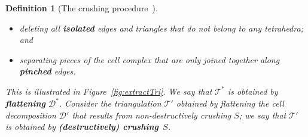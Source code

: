 \documentclass[10pt,a4paper]{amsart}
\newtheorem{definition}[theorem]{Definition}
\newcommand{\tri}{\mathcal{T}}
\begin{document}
\begin{definition}[The crushing procedure~{\cite[Definition~1]{burton2014crushing}}]
\begin{enumerate}
\begin{itemize}
        \item deleting all \textbf{isolated} edges and triangles that do not belong to any tetrahedra; and
        \item separating pieces of the cell complex that are only joined together along
        \textbf{pinched} edges.
    \end{itemize}
    This is illustrated in Figure~\ref{fig:extractTri}.
    We say that $\tri^\ast$ is obtained by \textbf{flattening} $\mathcal{D}^\ast$.
    Consider the triangulation $\tri'$ obtained by flattening
    the cell decomposition $\mathcal{D}'$ that results from non-destructively crushing $S$;
    we say that $\tri'$ is obtained by \textbf{(destructively) crushing}~$S$.
\qedhere
\end{enumerate}
\end{definition}
\end{document}
